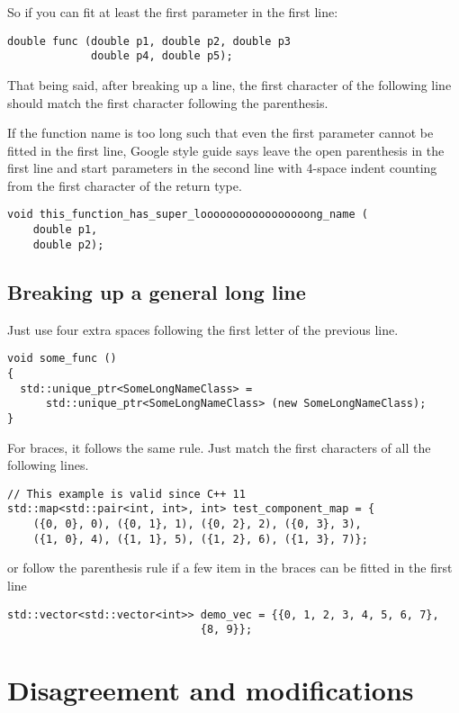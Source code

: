 \documentclass{article}
\begin{document}
So if you can fit at least the first parameter in the first line:
\begin{lstlisting}
double func (double p1, double p2, double p3
             double p4, double p5);
\end{lstlisting}
That being said, after breaking up a line, the first character of the following line should match the first character following the parenthesis.

If the function name is too long such that even the first parameter cannot be fitted in the first line, Google style guide says leave the open parenthesis in the first line and start parameters in the second line with 4-space indent counting from the first character of the return type.
\begin{lstlisting}
void this_function_has_super_looooooooooooooooong_name (
    double p1,
    double p2);
\end{lstlisting}

\subsection{Breaking up a general long line}
Just use four extra spaces following the first letter of the previous line.
\begin{lstlisting}
void some_func ()
{
  std::unique_ptr<SomeLongNameClass> = 
      std::unique_ptr<SomeLongNameClass> (new SomeLongNameClass);
}
\end{lstlisting}

For braces, it follows the same rule. Just match the first characters of all the following lines.
\begin{lstlisting}
// This example is valid since C++ 11
std::map<std::pair<int, int>, int> test_component_map = {
    ({0, 0}, 0), ({0, 1}, 1), ({0, 2}, 2), ({0, 3}, 3),
    ({1, 0}, 4), ({1, 1}, 5), ({1, 2}, 6), ({1, 3}, 7)};
\end{lstlisting}
or follow the parenthesis rule if a few item in the braces can be fitted in the first line
\begin{lstlisting}
std::vector<std::vector<int>> demo_vec = {{0, 1, 2, 3, 4, 5, 6, 7},
			                  {8, 9}};
\end{lstlisting}
\section{Disagreement and modifications}
\end{document}
